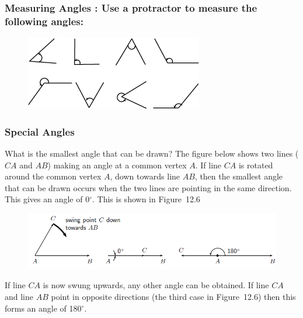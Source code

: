 \subsubsection{  Measuring Angles : Use a protractor to measure the following angles:}


\setcounter{subfigure}{0}
\begin{figure}[H] %
\begin{center}
\label{m39370*id314484!!!underscore!!!media}\label{m39370*id314484!!!underscore!!!printimage}\includegraphics{col11306.imgs/m39370_MG10C13_005.png} %
\vspace{2pt}
\vspace{.1in}
\end{center}
\end{figure}       
\par 

\subsubsection{ Special Angles}
\nopagebreak
What is the smallest angle that can be drawn? The figure below shows two lines ($CA$ and $AB$) making an angle at a common vertex $A$. If line $CA$ is rotated around the common vertex $A$, down towards line $AB$, then the smallest angle that can be drawn occurs when the two lines are pointing in the same direction. This gives an angle of 0$^{\circ }$. This is shown in Figure~12.6\par 

\setcounter{subfigure}{0}
\begin{figure}[H] %
\begin{center}
\label{m39370*id314593!!!underscore!!!media}\label{m39370*id314593!!!underscore!!!printimage}\includegraphics[width=.8\columnwidth]{col11306.imgs/m39370_MG10C13_006.png} %
\vspace{2pt}
\vspace{.1in}
\end{center}
\end{figure}       
\par 
If line $CA$ is now swung upwards, any other angle can be obtained. If line $CA$ and line $AB$ point in opposite directions (the third case in Figure~12.6) then this forms an angle of 180$^{\circ }$.\par 

